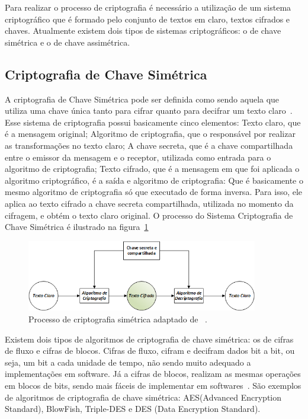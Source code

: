 Para realizar o processo de criptografia é necessário a utilização de um sistema criptográfico que é formado pelo conjunto de textos em claro, textos cifrados e chaves. Atualmente existem dois tipos de sistemas criptográficos: o de chave simétrica e o de chave assimétrica.

\subsection{Criptografia de Chave Simétrica}

A criptografia de Chave Simétrica pode ser definida como sendo aquela que utiliza uma chave única tanto para cifrar quanto para decifrar um texto claro~\cite{stallings2008}. Esse sistema de criptografia possui basicamente cinco elementos: Texto claro, que é a mensagem original; Algoritmo de criptografia, que o responsável por realizar as transformações no texto claro; A chave secreta, que é a chave compartilhada entre o emissor da mensagem e o receptor, utilizada como entrada para o algoritmo de criptografia; Texto cifrado, que é a mensagem em que foi aplicada o algoritmo criptográfico, é a saída e algoritmo de criptografia: Que é basicamente o mesmo algoritmo de criptografia só que executado de forma inversa. Para isso, ele aplica ao texto cifrado a chave secreta compartilhada, utilizada no momento da cifragem, e obtém o texto claro original. O processo do Sistema Criptografia de Chave Simétrica é ilustrado na figura~\ref{fig:criptografiasimetrica}

\begin{figure}[!htb]
\centering
\includegraphics[width=0.9\textwidth]{criptosimetrico.png}
\caption{Processo de criptografia simétrica adaptado de ~\cite{stallings2008}.}
\label{fig:criptografiasimetrica}
\end{figure}

Existem dois tipos de algoritmos de criptografia de chave simétrica: os de cifras de fluxo e cifras de blocos. Cifras de fluxo, cifram e decifram dados bit a bit, ou seja, um bit a cada unidade de tempo, não sendo muito adequado a implementações em software. Já a cifras de blocos, realizam as mesmas operações em blocos de bits, sendo mais fáceis de implementar em softwares~\cite{Schneier1995}. São exemplos de algoritmos de criptografia de chave simétrica: AES(Advanced Encryption Standard), BlowFish, Triple-DES e DES (Data Encryption Standard).



